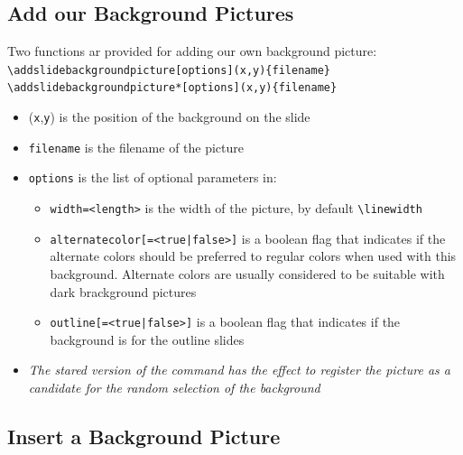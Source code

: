 \documentclass[english,sectioncirclenumberstyle]{ciadbeamer}
\begin{document}
\subsection{Add our Background Pictures}

\begin{frame}[t]{\subsecname}
	Two functions ar provided for adding our own background picture: \\[.25cm]
	\texttt{{\textbackslash}addslidebackgroundpicture[options](x,y)\{filename\}} \\[.25cm]
	\texttt{{\textbackslash}addslidebackgroundpicture*[options](x,y)\{filename\}} \\[.25cm]
	\begin{itemize}
		\item (\texttt{x},\texttt{y}) is the position of the background on the slide
		\item \texttt{filename} is the filename of the picture
		\item \texttt{options} is the list of optional parameters in:
			\begin{itemize}
			\item \texttt{width=<length>} is the width of the picture, by default \texttt{{\textbackslash}linewidth}
			\item \texttt{alternatecolor[=<true|false>]} is a boolean flag that indicates if the alternate colors should be preferred to regular colors when used with this background. Alternate colors are usually considered to be suitable with dark brackground pictures
			\item \texttt{outline[=<true|false>]} is a boolean flag that indicates if the background is for the outline slides
			\end{itemize}
		\item \emph{The stared version of the command has the effect to register the picture as a candidate for the random selection of the background}
	\end{itemize}
\end{frame}

\subsection{Insert a Background Picture}
\end{document}
